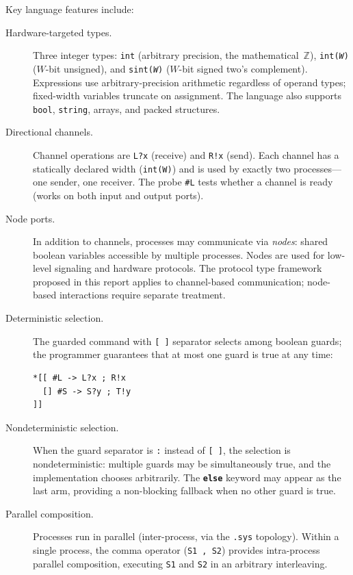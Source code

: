 \documentclass[11pt]{article}
\newcommand{\keyword}[1]{\texttt{\textbf{#1}}}
\newcommand{\nonterminal}[1]{\textit{#1}}
\begin{document}
Key language features include:
\begin{description}
\item[Hardware-targeted types.]
  Three integer types: \texttt{int} (arbitrary precision, the
  mathematical~$\mathbb{Z}$), \texttt{int(\nonterminal{W})} ($W$-bit
  unsigned), and \texttt{sint(\nonterminal{W})} ($W$-bit signed two's
  complement).  Expressions use arbitrary-precision arithmetic
  regardless of operand types; fixed-width variables truncate on
  assignment.  The language also supports \texttt{bool}, \texttt{string},
  arrays, and packed structures.

\item[Directional channels.]
  Channel operations are \texttt{L?x} (receive) and \texttt{R!x}
  (send).  Each channel has a statically declared width (\texttt{int(W)})
  and is used by exactly two processes---one sender, one receiver.
  The probe \texttt{\#L} tests whether a channel is ready (works on
  both input and output ports).

\item[Node ports.]
  In addition to channels, processes may communicate via \emph{nodes}:
  shared boolean variables accessible by multiple processes.  Nodes
  are used for low-level signaling and hardware protocols.  The
  protocol type framework proposed in this report applies to
  channel-based communication; node-based interactions require
  separate treatment.

\item[Deterministic selection.]
  The guarded command with \texttt{[\,]} separator selects among
  boolean guards; the programmer guarantees that at most one guard is
  true at any time:
\begin{Verbatim}[samepage=true]
*[[ #L -> L?x ; R!x
  [] #S -> S?y ; T!y
]]
\end{Verbatim}

\item[Nondeterministic selection.]
  When the guard separator is \texttt{:} instead of \texttt{[\,]},
  the selection is nondeterministic: multiple guards may be
  simultaneously true, and the implementation chooses arbitrarily.
  The \keyword{else} keyword may appear as the last arm, providing a
  non-blocking fallback when no other guard is true.

\item[Parallel composition.]
  Processes run in parallel (inter-process, via the \texttt{.sys}
  topology).  Within a single process, the comma operator
  (\texttt{S1\,,\,S2}) provides intra-process parallel composition,
  executing \texttt{S1} and \texttt{S2} in an arbitrary interleaving.


\end{description}
\end{document}

